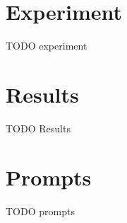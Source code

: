\documentclass[12pt]{article}
\begin{document}
\section{Experiment}




TODO experiment



\section{Results}
TODO Results



\appendix

\section{Prompts} 
TODO prompts

\printbibliography
    
\end{document}
